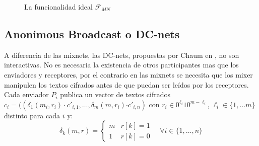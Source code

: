 \begin{figure}
\begin{centering}
\end{centering}
\caption{La funcionalidad ideal $\mathcal{F}_{MN}$}
\label{func:F_MN}
\end{figure}

\subsection{Anonimous Broadcast o DC-nets}

A diferencia de las mixnets, las DC-nets, propuestas por Chaum en
\cite{journals/joc/Chaum88}, no son interactivas. No es necesaria
la existencia de otros participantes mas que los enviadores y receptores,
por el contrario en las mixnets se necesita que los mixer manipulen
los textos cifrados antes de que puedan ser leídos por los receptores.
Cada enviador $P_{i}$ publica un vector de textos cifrados
$c_{i}=((\delta_{1}(m_{i},r_{i})\cdot c'_{i,1},\ldots,\delta_{m}(m,r_{i})\text{·}c'_{i,n})$
con $r_{i}\in0^{\ell_{i}}10^{m-\ell_{i}}$, $\ell_i \in \{1, \ldots m\}$ distinto para cada
$i$ y:
\[
\delta_{k}(m,r)=\begin{cases}
m & r[k]=1\\
1 & r[k]=0\end{cases}\quad\forall i\in\{1,\ldots,n\}\]


